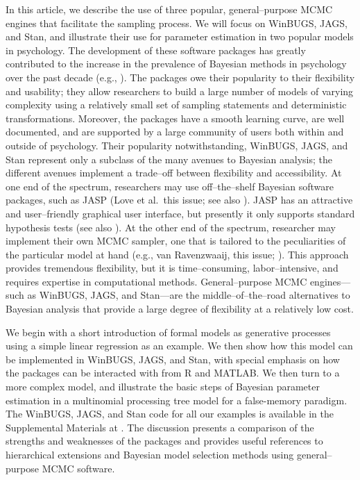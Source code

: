 In this article, we describe the use of three popular, general--purpose MCMC engines that facilitate the sampling process. {We will focus on WinBUGS, JAGS, and Stan, and illustrate their use for parameter estimation in two popular models in psychology. The development of these software packages has greatly contributed to the increase in the prevalence of Bayesian methods in psychology over the past decade (e.g., ). The packages owe their popularity to their flexibility and usability; they allow researchers to build a large number of models of varying complexity using a relatively small set of sampling statements and deterministic transformations. Moreover, the packages have a smooth learning curve, are well documented, and are supported by a large community of users both within and outside of psychology. Their popularity notwithstanding, WinBUGS, JAGS, and Stan represent only a subclass of the many avenues to Bayesian analysis; the different avenues implement a trade--off between flexibility and accessibility. At one end of the spectrum, researchers may use off--the--shelf Bayesian software packages, such as JASP (Love et al.\ this issue; see also ). JASP has an attractive and user--friendly graphical user interface, but presently it only supports standard hypothesis tests (see also ). At the other end of the spectrum, researcher may implement their own MCMC sampler, one that is tailored to the peculiarities of the particular model at hand (e.g., van Ravenzwaaij, this issue; ). This approach provides tremendous flexibility, but it is time--consuming, labor--intensive, and requires expertise in computational methods. General--purpose MCMC engines---such as WinBUGS, JAGS, and Stan---are the middle--of--the--road alternatives to Bayesian analysis that provide a large degree of flexibility at a relatively low cost.}

{We begin with a short introduction of formal models as generative processes using a simple linear regression as an example. We then show how this model can be implemented in WinBUGS, JAGS, and Stan, with special emphasis on how the packages can be interacted with from R and MATLAB. We then turn to a more complex model, and illustrate the basic steps of Bayesian parameter estimation in a multinomial processing tree model for a false-memory paradigm. The WinBUGS, JAGS, and Stan code for all our examples is available in the Supplemental Materials at \osf{}. The discussion presents a comparison of the strengths and weaknesses of the packages and provides useful references to hierarchical extensions and Bayesian model selection methods using general--purpose MCMC software.} 

